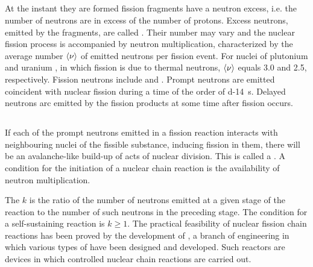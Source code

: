 \subsection{}\label{42.9.11} At the instant they are formed fission fragments have a neutron excess, i.e. the number of neutrons are in excess of the number of protons. Excess neutrons, emitted by the fragments, are called . Their number may vary and the nuclear fission process is accompanied by neutron multiplication, characterized by the average number $\expval{\nu}$ of emitted neutrons per fission event. For nuclei of plutonium  and uranium , in which fission is due to thermal neutrons, $\expval{\nu}$ equals 3.0 and 2.5, respectively. Fission neutrons include  and . Prompt neutrons are emitted coincident with nuclear fission during a time of the order of \SI{d-14}{\second}. Delayed neutrons arc emitted by the fission products at some time after fission occurs.

\subsection{}\label{42.9.12} If each of the prompt neutrons emitted in a fission reaction  interacts with neighbouring nuclei of the fissible substance, inducing fission in them, there will be an avalanche-like build-up of acts of nuclear division. This is called a . A condition for the initiation of a nuclear chain reaction is the availability of neutron multiplication.

The  $k$ is the ratio of the number of neutrons emitted at a given stage of the reaction to the number of such neutrons in the preceding stage. The condition for a self-sustaining reaction is $k \geqslant 1$. The practical feasibility of nuclear fission chain reactions has been proved by the development of , a branch of engineering in which various types of  have been designed and developed. Such reactors are devices in which controlled nuclear chain reactions are carried out.

